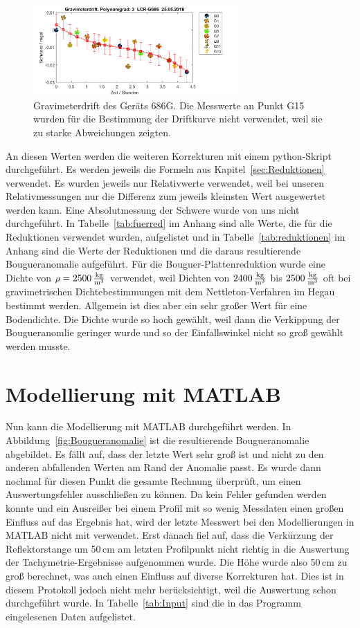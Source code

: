 \begin{figure}[!ht]
 \centering
 \includegraphics[width=0.7\textwidth]{fig/G686drift_endgultig}
 \caption[Gravimeterdrift des Geräts 686G]{Gravimeterdrift des Geräts 686G. Die Messwerte an Punkt G15 wurden für die Bestimmung der Driftkurve nicht verwendet, weil sie zu starke Abweichungen zeigten.}
 \label{fig:drift2}
\end{figure}

An diesen Werten werden die weiteren Korrekturen mit einem python-Skript durchgeführt. Es werden jeweils die Formeln aus Kapitel~\ref{sec:Reduktionen} verwendet. Es wurden jeweils nur Relativwerte verwendet, weil bei unseren Relativmessungen nur die Differenz zum jeweils kleinsten Wert ausgewertet werden kann. Eine Absolutmessung der Schwere wurde von uns nicht durchgeführt. In Tabelle~\ref{tab:fuerred} im Anhang sind alle Werte, die für die Reduktionen verwendet wurden, aufgelistet und in Tabelle~\ref{tab:reduktionen} im Anhang sind die Werte der Reduktionen und die daraus resultierende Bougueranomalie aufgeführt. Für die Bouguer-Plattenreduktion wurde eine Dichte von $\rho=2500\,\frac{\mathrm{kg}}{\mathrm{m^3}}$ verwendet, weil Dichten von $2400\,\frac{\mathrm{kg}}{\mathrm{m^3}}$ bis $2500\,\frac{\mathrm{kg}}{\mathrm{m^3}}$ oft bei gravimetrischen Dichtebestimmungen mit dem Nettleton-Verfahren im Hegau bestimmt werden. Allgemein ist dies aber ein sehr großer Wert für eine Bodendichte. Die Dichte wurde so hoch gewählt, weil dann die Verkippung der Bougueranomlie geringer wurde und so der Einfallswinkel nicht so groß gewählt werden musste.

\section{Modellierung mit MATLAB}
\label{sec:ModMAT}

Nun kann die Modellierung mit MATLAB durchgeführt werden. In Abbildung~\ref{fig:Bougueranomalie} ist die resultierende Bougueranomalie abgebildet. Es fällt auf, dass der letzte Wert sehr groß ist und nicht zu den anderen abfallenden Werten am Rand der Anomalie passt. Es wurde dann nochmal für diesen Punkt die gesamte Rechnung überprüft, um einen Auswertungsfehler ausschließen zu können. Da kein Fehler gefunden werden konnte und ein Ausreißer bei einem Profil mit so wenig Messdaten einen großen Einfluss auf das Ergebnis hat, wird der letzte Messwert bei den Modellierungen in MATLAB nicht mit verwendet. Erst danach fiel auf, dass die Verkürzung der Reflektorstange um 50\,cm am letzten Profilpunkt nicht richtig in die Auswertung der Tachymetrie-Ergebnisse aufgenommen wurde. Die Höhe wurde also 50\,cm zu groß berechnet, was auch einen Einfluss auf diverse Korrekturen hat. Dies ist in diesem Protokoll jedoch nicht mehr berücksichtigt, weil die Auswertung schon durchgeführt wurde.
In Tabelle~\ref{tab:Input} sind die in das Programm eingelesenen Daten aufgelistet.

